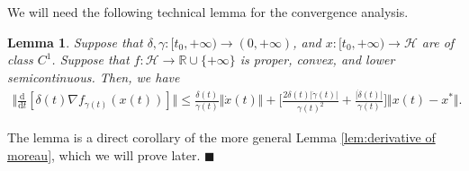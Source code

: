 \documentclass[11pt]{article}
\numberwithin{equation}{section}
\newenvironment{proof}{\bigskip\noindent{\bf Proof.}}{\hfill $\blacksquare$ \par\bigskip\noindent}
\newtheorem{lemma}{Lemma}[section]
\begin{document}
We will need the following technical lemma for the convergence analysis. 
\begin{lemma}
\label{lemma: derivative-gradient}
Suppose that $\delta, \gamma:[t_0,+\infty) \to (0,+\infty)$, and $x:[t_0,+\infty)\to \mathcal{H}$ are of class $C^1$. Suppose that $f:\mathcal{H}\to\mathbb{R}\cup\{+\infty\}$ is proper, convex, and lower semicontinuous. Then, we have 
\begin{align*}
    \Big\Vert \frac{\mathrm{d}}{\mathrm{d}t}[\delta(t)\nabla f_{\gamma(t)}(x(t))] \Big \Vert \le \frac{\delta(t)}{\gamma(t)}\Vert \dot{x}(t) \Vert+\Big[\frac{2\delta(t)\vert \dot{\gamma}(t)\vert}{\gamma(t)^2}+\frac{\vert \dot{\delta}(t)\vert}{\gamma(t)}\Big]\Vert x(t)-x^* \Vert. 
\end{align*}
\end{lemma}
\begin{proof}
The lemma is a direct corollary of the more general Lemma \ref{lem:derivative of moreau}, which we will prove later. 
\end{proof}
\end{document}
